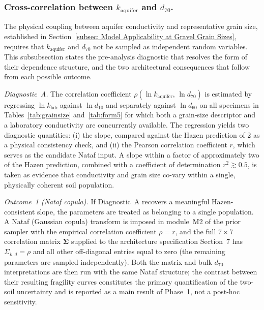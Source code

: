 \subsubsection*{Cross-correlation between $k_\mathrm{aquifer}$ and $d_{70}$.}
\label{subsubsec: k-d70 cross-correlation}

The physical coupling between aquifer conductivity and representative grain size, established in Section~\ref{subsec: Model Applicability at Gravel Grain Sizes}, requires that $k_\mathrm{aquifer}$ and $d_{70}$ not be sampled as independent random variables. This subsubsection states the pre-analysis diagnostic that resolves the form of their dependence structure, and the two architectural consequences that follow from each possible outcome.

\textit{Diagnostic~A.} The correlation coefficient $\rho(\ln k_\mathrm{aquifer},\, \ln d_{70})$ is estimated by regressing $\ln k_\mathrm{lab}$ against $\ln d_{10}$ and separately against $\ln d_{60}$ on all specimens in Tables~\ref{tab:grainsize} and~\ref{tab:form5} for which both a grain-size descriptor and a laboratory conductivity are concurrently available. The regression yields two diagnostic quantities: (i) the slope, compared against the Hazen prediction of 2 as a physical consistency check, and (ii) the Pearson correlation coefficient $r$, which serves as the candidate Nataf input. A slope within a factor of approximately two of the Hazen prediction, combined with a coefficient of determination $r^2 \gtrsim 0.5$, is taken as evidence that conductivity and grain size co-vary within a single, physically coherent soil population.

\textit{Outcome~1 (Nataf copula).} If Diagnostic~A recovers a meaningful Hazen-consistent slope, the parameters are treated as belonging to a single population. A Nataf (Gaussian copula) transform is imposed in module~M2 of the prior sampler with the empirical correlation coefficient $\rho = r$, and the full $7 \times 7$ correlation matrix $\boldsymbol{\Sigma}$ supplied to the architecture specification Section~7 has $\Sigma_{k,d} = \rho$ and all other off-diagonal entries equal to zero (the remaining parameters are sampled independently). Both the matrix and bulk $d_{70}$ interpretations are then run with the same Nataf structure; the contrast between their resulting fragility curves constitutes the primary quantification of the two-soil uncertainty and is reported as a main result of Phase~1, not a post-hoc sensitivity.

